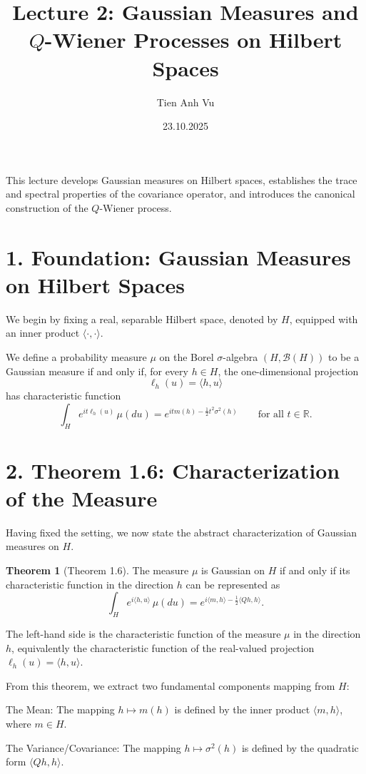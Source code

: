 \documentclass[11pt]{article}
\title{Lecture 2: Gaussian Measures and \(Q\)-Wiener Processes on Hilbert Spaces}
\date{23.10.2025}
\author{Tien Anh Vu}
\theoremstyle{definition}
\newtheorem{theorem}{Theorem}
\theoremstyle{remark}
\begin{document}
\maketitle

This lecture develops Gaussian measures on Hilbert spaces, establishes the trace and spectral properties of the covariance operator, and introduces the canonical construction of the \(Q\)-Wiener process.

\section*{1. Foundation: Gaussian Measures on Hilbert Spaces}
We begin by fixing a real, separable Hilbert space, denoted by $H$, equipped with an inner product $\langle \cdot,\cdot\rangle$.

We define a probability measure $\mu$ on the Borel $\sigma$-algebra $(H,\mathcal B(H))$ to be a Gaussian measure if and only if, for every $h\in H$, the one-dimensional projection
\[
\ell_h(u)=\langle h,u\rangle
\]
has characteristic function
\[
\int_H e^{it\ell_h(u)}\,\mu(du)=e^{itm(h)-\frac{1}{2}t^2\sigma^2(h)}
\qquad \text{for all } t\in\mathbb R.
\]

\section*{2. Theorem 1.6: Characterization of the Measure}
Having fixed the setting, we now state the abstract characterization of Gaussian measures on $H$.

\begin{theorem}[Theorem 1.6]
The measure $\mu$ is Gaussian on $H$ if and only if its characteristic function in the direction $h$ can be represented as
\[
\int_H e^{i\langle h,u\rangle}\,\mu(du)=e^{i\langle m,h\rangle-\frac{1}{2}\langle Qh,h\rangle}.
\]
\end{theorem}

The left-hand side is the characteristic function of the measure $\mu$ in the direction $h$, equivalently the characteristic function of the real-valued projection $\ell_h(u)=\langle h,u\rangle$.

From this theorem, we extract two fundamental components mapping from $H$:

The Mean: The mapping $h\mapsto m(h)$ is defined by the inner product $\langle m,h\rangle$, where $m\in H$.

The Variance/Covariance: The mapping $h\mapsto \sigma^2(h)$ is defined by the quadratic form $\langle Qh,h\rangle$.
\end{document}
